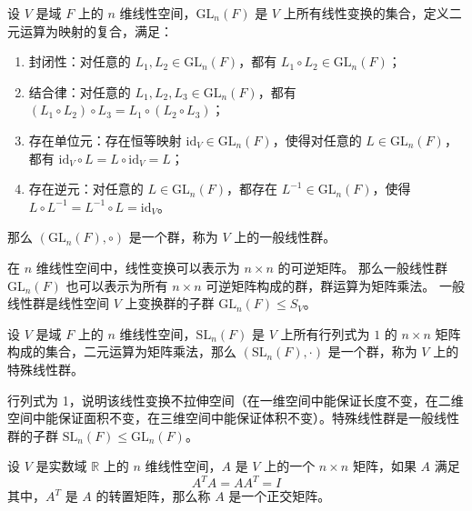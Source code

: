 \begin{definition}
    设 $V$ 是域 $F$ 上的 $n$ 维线性空间，$\mathrm{GL}_n(F)$ 是 $V$ 上所有线性变换的集合，定义二元运算为映射的复合，满足：
    \begin{enumerate}
        \item 封闭性：对任意的 $L_1, L_2\in \mathrm{GL}_n(F)$，都有 $L_1 \circ L_2 \in \mathrm{GL}_n(F)$；
        \item 结合律：对任意的 $L_1, L_2, L_3\in \mathrm{GL}_n(F)$，都有 $(L_1 \circ L_2) \circ L_3 = L_1 \circ (L_2 \circ L_3)$；
        \item 存在单位元：存在恒等映射 $\mathrm{id}_V\in \mathrm{GL}_n(F)$，使得对任意的 $L\in \mathrm{GL}_n(F)$，都有 $\mathrm{id}_V \circ L = L \circ \mathrm{id}_V = L$；
        \item 存在逆元：对任意的 $L\in \mathrm{GL}_n(F)$，都存在 $L^{-1}\in \mathrm{GL}_n(F)$，使得 $L \circ L^{-1} = L^{-1} \circ L = \mathrm{id}_V$。
    \end{enumerate}    
    那么 $(\mathrm{GL}_n(F), \circ)$ 是一个群，称为 $V$ 上的一般线性群。
\end{definition}

\begin{note}
    在 $n$ 维线性空间中，线性变换可以表示为 $n\times n$ 的可逆矩阵。
    那么一般线性群 $\mathrm{GL}_n(F)$ 也可以表示为所有 $n\times n$ 可逆矩阵构成的群，群运算为矩阵乘法。
    一般线性群是线性空间 $V$ 上变换群的子群 $\mathrm{GL}_n(F) \leq S_V$。
\end{note}

\vspace{0.5em}

\begin{definition}
    设 $V$ 是域 $F$ 上的 $n$ 维线性空间，$\mathrm{SL}_n(F)$ 是 $V$ 上所有行列式为 $1$ 的 $n\times n$ 矩阵构成的集合，二元运算为矩阵乘法，那么 $(\mathrm{SL}_n(F), \cdot)$ 是一个群，称为 $V$ 上的特殊线性群。
\end{definition}
\begin{note}
    行列式为 1，说明该线性变换不拉伸空间（在一维空间中能保证长度不变，在二维空间中能保证面积不变，在三维空间中能保证体积不变）。特殊线性群是一般线性群的子群 $\mathrm{SL}_n(F) \leq \mathrm{GL}_n(F)$。
\end{note}

\vspace{0.5em}

\begin{definition}
    设 $V$ 是实数域 $\mathbb{R}$ 上的 $n$ 维线性空间，$A$ 是 $V$ 上的一个 $n\times n$ 矩阵，如果 $A$ 满足
    \[
        A^T A = A A^T = I
    \]
    其中，$A^T$ 是 $A$ 的转置矩阵，那么称 $A$ 是一个正交矩阵。
\end{definition}

